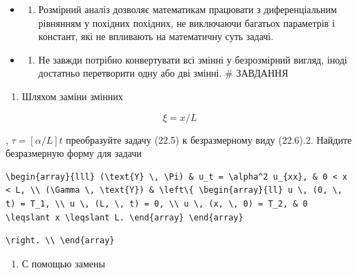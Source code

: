 \documentclass[
  ukrainian,
]{article}
\providecommand{\tightlist}{%
  \setlength{\itemsep}{0pt}\setlength{\parskip}{0pt}}
\begin{document}
\begin{itemize}
\tightlist
\item
  \begin{enumerate}
  \def\labelenumi{\arabic{enumi}.}
  \setcounter{enumi}{1}
  \tightlist
  \item
    Розмірний аналіз дозволяє математикам працювати з диференціальним
    рівнянням у похідних похідних, не виключаючи багатьох параметрів і
    констант, які не впливають на математичну суть задачі.
  \end{enumerate}
\item
  \begin{enumerate}
  \def\labelenumi{\arabic{enumi}.}
  \setcounter{enumi}{2}
  \tightlist
  \item
    Не завжди потрібно конвертувати всі змінні у безрозмірний вигляд,
    іноді достатньо перетворити одну або дві змінні. \# ЗАВДАННЯ
  \end{enumerate}
\end{itemize}

\begin{enumerate}
\def\labelenumi{\arabic{enumi}.}
\tightlist
\item
  Шляхом заміни змінних
\end{enumerate}

\[
\xi = x/L
\]

, \(\tau = [\alpha/L] t\) преобразуйте задачу (22.5) к безразмерному
виду (22.6).2. Найдите безразмерную форму для задачи

\begin{verbatim}
\begin{array}{lll} (\text{Y} \, \Pi) & u_t = \alpha^2 u_{xx}, & 0 < x < L, \\ (\Gamma \, \text{Y}) & \left\{ \begin{array}{ll} u \, (0, \, t) = T_1, \\ u \, (L, \, t) = 0, \\ u \, (x, \, 0) = T_2, & 0 \leqslant x \leqslant L. \end{array} \end{array}
\end{verbatim}

\begin{verbatim}
\right. \\ \end{array}
\end{verbatim}

\begin{enumerate}
\def\labelenumi{\arabic{enumi}.}
\setcounter{enumi}{2}
\tightlist
\item
  С помощью замены
\end{enumerate}
\end{document}
